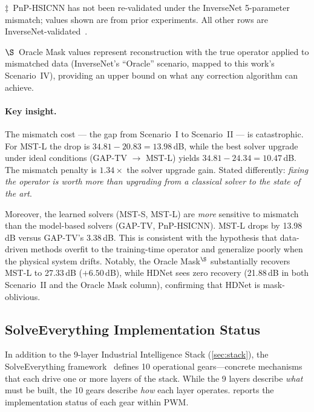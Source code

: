 \smallskip
{\footnotesize $\ddagger$~PnP-HSICNN has not been re-validated under the InverseNet 5-parameter mismatch; values shown are from prior experiments.  All other rows are InverseNet-validated~\cite{yang2026inversenet}.}

\smallskip
{\footnotesize $\S$~Oracle Mask values represent reconstruction with the true operator applied to mismatched data (InverseNet's ``Oracle'' scenario, mapped to this work's Scenario~IV), providing an upper bound on what any correction algorithm can achieve.}

\paragraph{Key insight.}
The mismatch cost --- the gap from Scenario~I to Scenario~II --- is
catastrophic.  For MST-L the drop is $34.81 - 20.83 = 13.98$\,dB, while
the best solver upgrade under ideal conditions (GAP-TV $\to$ MST-L)
yields $34.81 - 24.34 = 10.47$\,dB.  The mismatch penalty is
\textbf{$1.34\times$} the solver upgrade gain.  Stated differently:
\emph{fixing the operator is worth more than upgrading from a classical
solver to the state of the art}.

Moreover, the learned solvers (MST-S, MST-L) are \emph{more} sensitive
to mismatch than the model-based solvers (GAP-TV, PnP-HSICNN).  MST-L
drops by 13.98\,dB versus GAP-TV's 3.38\,dB.  This is consistent with the
hypothesis that data-driven methods overfit to the training-time operator
and generalize poorly when the physical system drifts.  Notably, the
Oracle Mask$^\S$ substantially recovers MST-L to 27.33\,dB
($+6.50$\,dB), while HDNet sees zero recovery (21.88\,dB in both Scenario~II
and the Oracle Mask column), confirming that HDNet is mask-oblivious.

\subsection{SolveEverything Implementation Status}

In addition to the 9-layer Industrial Intelligence Stack (\cref{sec:stack}), the SolveEverything framework~\cite{wissner2026solveeverything} defines 10 operational gears---concrete mechanisms that each drive one or more layers of the stack.  While the 9 layers describe \emph{what} must be built, the 10 gears describe \emph{how} each layer operates.   reports the implementation status of each gear within PWM.

